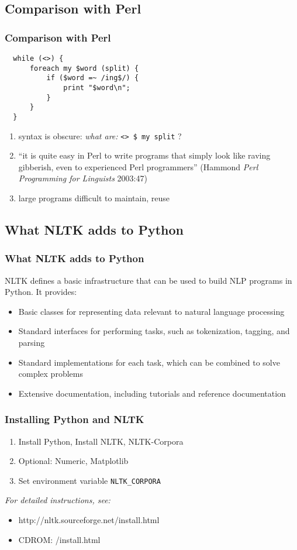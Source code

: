 \documentclass{beamer}             %
\begin{document}
\subsection{Comparison with Perl}
\begin{frame}[fragile]
\frametitle{Comparison with Perl}

\begin{verbatim}
  while (<>) {
      foreach my $word (split) {
          if ($word =~ /ing$/) {
              print "$word\n";
          }
      }
  }
\end{verbatim}

\begin{enumerate}
\item syntax is obscure: \textit{what are:} \verb|<> $ my split| ?
\item ``it is quite easy in Perl to write programs that simply
  look like raving gibberish, even to experienced Perl programmers''
  (Hammond \textit{Perl Programming for Linguists} 2003:47)
\item large programs difficult to maintain, reuse
\end{enumerate}
\end{frame}

\subsection{What NLTK adds to Python}
\begin{frame}
\frametitle{What NLTK adds to Python}

NLTK defines a basic infrastructure that can be used to build NLP
programs in Python.  It provides:

\begin{itemize}
\item Basic classes for representing data relevant to natural language
  processing
\item Standard interfaces for performing tasks, such
  as tokenization, tagging, and parsing
\item Standard implementations for each task, which
  can be combined to solve complex problems
\item Extensive documentation, including tutorials
  and reference documentation
\end{itemize}
\end{frame}

\begin{frame}[fragile]
\frametitle{Installing Python and NLTK}
\begin{enumerate}
\item Install Python, Install NLTK, NLTK-Corpora
\item Optional: Numeric, Matplotlib
\item Set environment variable \verb|NLTK_CORPORA|
\end{enumerate}

\textit{For detailed instructions, see:}

\begin{itemize}
\item  http://nltk.sourceforge.net/install.html
\item  CDROM: /install.html
\end{itemize}

\end{frame}
\end{document}
